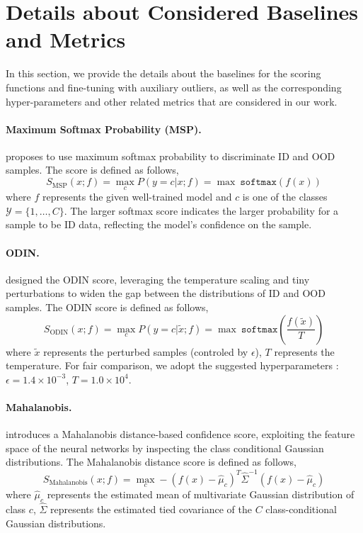 \documentclass{article}
\theoremstyle{plain}
\theoremstyle{definition}
\theoremstyle{remark}
\begin{document}
\section{Details about Considered Baselines and Metrics}
\label{app:baseline_info}

In this section, we provide the details about the baselines for the scoring functions and fine-tuning with auxiliary outliers, as well as the corresponding hyper-parameters and other related metrics that are considered in our work.
\paragraph{Maximum Softmax Probability (MSP).} \citep{hendrycks17baseline} proposes to use maximum softmax probability to discriminate ID and OOD samples. The score is defined as follows,
\begin{equation}
    S_\text{MSP}(x; f) = \max_cP(y = c | x; f) = \max~\texttt{softmax}(f(x))
\end{equation}
where $f$ represents the given well-trained model and $c$ is one of the classes $\mathcal{Y}=\{1,\ldots, C\}$. The larger softmax score indicates the larger probability for a sample to be ID data, reflecting the model's confidence on the sample. 

\paragraph{ODIN.} \citep{LiangLS18} designed the ODIN score, leveraging the temperature scaling and tiny perturbations to widen the gap between the distributions of ID and OOD samples. The ODIN score is defined as follows,
\begin{equation}
    S_\text{ODIN}(x; f) = \max_cP(y = c | \tilde{x}; f) = \max~\texttt{softmax}(\frac{f(\tilde{x})}{T})
\end{equation}
where $\tilde{x}$ represents the perturbed samples (controled by $\epsilon$), $T$ represents the temperature. For fair comparison, we adopt the suggested hyperparameters \citep{LiangLS18}: $\epsilon = 1.4\times 10^{-3}$, $T = 1.0 \times 10^4$.

\paragraph{Mahalanobis.} \citep{10.5555/3327757.3327819} introduces a Mahalanobis distance-based confidence score, exploiting the feature space of the neural networks by inspecting the class conditional Gaussian distributions. The Mahalanobis distance score is defined as follows,
\begin{equation}
    S_\text{Mahalanobis}(x; f) = \max \limits_{c} - (f(x) - \hat{\mu}_c)^T \hat{\Sigma}^{-1}(f(x) - \hat{\mu}_c)
\end{equation}
where $\hat{\mu}_c$ represents the estimated mean of multivariate Gaussian distribution of class $c$, $\hat{\Sigma}$ represents the estimated tied covariance of the $C$ class-conditional Gaussian distributions.
\end{document}
